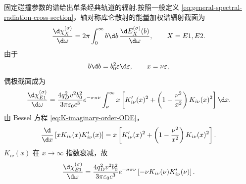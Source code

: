 固定碰撞参数的谱给出单条经典轨道的辐射.按照一般定义 \eqref{eq:general-spectral-radiation-cross-section}，轴对称库仑散射的能量加权谱辐射截面为
\begin{equation}
 \frac{\d\chi_X^{(\sigma)}}{\d\omega}
 =2\pi\int_0^\infty b\d b\,
 \frac{\d E_X^{(\sigma)}(b)}{\d\omega},
 \qquad X=E1,E2.
 \label{eq:spectral-radiation-cross-section-general-def}
\end{equation}
由于
\begin{equation}
 b\d b=b_0^2\varepsilon\d\varepsilon,
 \qquad
 x=\nu\varepsilon,
\end{equation}
偶极截面成为
\begin{equation}
 \frac{\d\chi_{E1}^{(\sigma)}}{\d\omega}
 =\frac{4q_D^2v^2b_0^2}{3\pi\varepsilon_0c^3}e^{-\sigma\pi\nu}
 \int_\nu^\infty x\left[
 K_{i\nu}'(x)^2+
 \left(1-\frac{\nu^2}{x^2}\right)K_{i\nu}(x)^2
 \right]\d x.
 \label{eq:E1-cross-section-integral}
\end{equation}
由 Bessel 方程 \eqref{eq:K-imaginary-order-ODE}，
\begin{equation}
 \frac{\d}{\d x}\left[xK_{i\nu}(x)K_{i\nu}'(x)\right]
 =x\left[
 K_{i\nu}'(x)^2+
 \left(1-\frac{\nu^2}{x^2}\right)K_{i\nu}(x)^2
 \right].
 \label{eq:E1-cross-section-antiderivative}
\end{equation}
$K_{i\nu}(x)$ 在 $x\to\infty$ 指数衰减，故
\begin{equation}
 \frac{\d\chi_{E1}^{(\sigma)}}{\d\omega}
 =\frac{4q_D^2v^2b_0^2}{3\pi\varepsilon_0c^3}
 e^{-\sigma\pi\nu}
 \left[-\nu K_{i\nu}(\nu)K_{i\nu}'(\nu)\right].
 \label{eq:exact-E1-cross-section-closed}
\end{equation}

